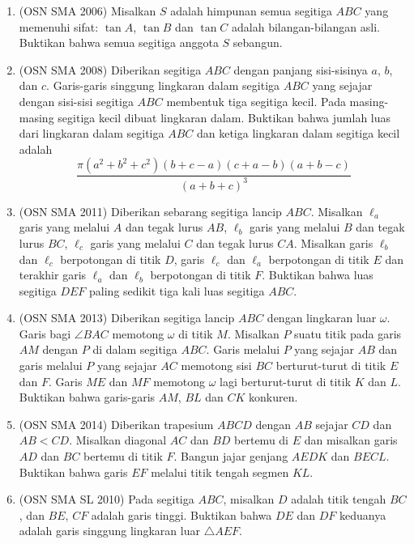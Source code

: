 \documentclass[11pt]{scrartcl}
\begin{document}
\begin{enumerate}
    \item (OSN SMA 2006) Misalkan $S$ adalah himpunan semua segitiga $ABC$ yang memenuhi sifat: $\tan A$, $\tan B$ dan $\tan C$ adalah bilangan-bilangan asli. Buktikan bahwa semua segitiga anggota $S$ sebangun.

    \item (OSN SMA 2008) Diberikan segitiga $ABC$ dengan panjang sisi-sisinya $a$, $b$, dan $c$. Garis-garis singgung lingkaran dalam segitiga $ABC$ yang sejajar dengan sisi-sisi segitiga $ABC$ membentuk tiga segitiga kecil. Pada masing-masing segitiga kecil dibuat lingkaran dalam. Buktikan bahwa jumlah luas dari lingkaran dalam segitiga $ABC$ dan ketiga lingkaran dalam segitiga kecil adalah
    \[\frac{\pi(a^2 + b^2 + c^2)(b + c - a)(c + a - b)(a + b - c)}{(a + b + c)^3}\]

    \item (OSN SMA 2011) Diberikan sebarang segitiga lancip $ABC$. Misalkan $\ell_a$ garis yang melalui $A$ dan tegak lurus $AB$, $\ell_b$ garis yang melalui $B$ dan tegak lurus $BC$, $\ell_c$ garis yang melalui $C$ dan tegak lurus $CA$. Misalkan garis $\ell_b$ dan $\ell_c$ berpotongan di titik $D$, garis $\ell_c$ dan $\ell_a$ berpotongan di titik $E$ dan terakhir garis $\ell_a$ dan $\ell_b$ berpotongan di titik $F$. Buktikan bahwa luas segitiga $DEF$ paling sedikit tiga kali luas segitiga $ABC$.

    \item (OSN SMA 2013) Diberikan segitiga lancip $ABC$ dengan lingkaran luar $\omega$. Garis bagi $\angle BAC$ memotong $\omega$ di titik $M$. Misalkan $P$ suatu titik pada garis $AM$ dengan $P$ di dalam segitiga $ABC$. Garis melalui $P$ yang sejajar $AB$ dan garis melalui $P$ yang sejajar $AC$ memotong sisi $BC$ berturut-turut di titik $E$ dan $F$. Garis $ME$ dan $MF$ memotong $\omega$ lagi berturut-turut di titik $K$ dan $L$. Buktikan bahwa garis-garis $AM$, $BL$ dan $CK$ konkuren.

    \item (OSN SMA 2014) Diberikan trapesium $ABCD$ dengan $AB$ sejajar $CD$ dan $AB < CD$. Misalkan diagonal $AC$ dan $BD$ bertemu di $E$ dan misalkan garis $AD$ dan $BC$ bertemu di titik $F$. Bangun jajar genjang $AEDK$ dan $BECL$. Buktikan bahwa garis $EF$ melalui titik tengah segmen $KL$.

    \item (OSN SMA SL 2010) Pada segitiga $ABC$, misalkan $D$ adalah titik tengah $BC$, dan $BE$, $CF$ adalah garis tinggi. Buktikan bahwa $DE$ dan $DF$ keduanya adalah garis singgung lingkaran luar $\triangle AEF$. %

\end{enumerate}
\end{document}
